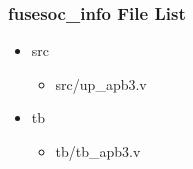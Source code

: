 \subsubsection{fusesoc\_info File List}
\begin{itemize}
\item src
	\begin{itemize}
	\item src/up\_apb3.v
	\end{itemize}
\item tb
	\begin{itemize}
	\item tb/tb\_apb3.v
	\end{itemize}
\end{itemize}
